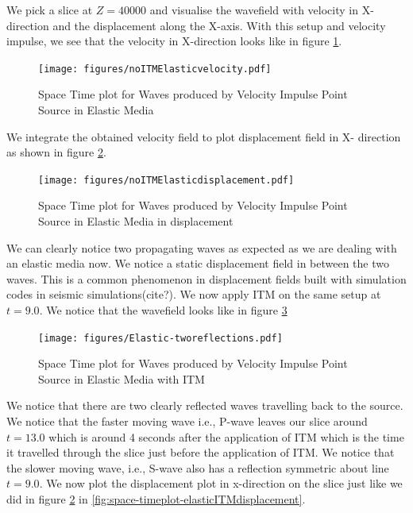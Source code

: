 We pick a slice at $Z = 40000$ and visualise the wavefield with velocity in X-direction and the displacement along the X-axis. With this setup and velocity impulse, 
we see that the velocity in X-direction looks like in figure \ref{fig:space-timeplot-elasticnoITM}.

\begin{figure}
    \centering
    \texttt{[image: figures/noITMElasticvelocity.pdf]}
    \caption{Space Time plot for Waves produced by Velocity Impulse Point Source in Elastic Media}
    \label{fig:space-timeplot-elasticnoITM}
\end{figure}

We integrate the obtained velocity field to plot displacement field in X- direction as shown in figure \ref{fig:space-timeplot-elasticnoITMdisplacement}.

\begin{figure}
    \centering
    \texttt{[image: figures/noITMElasticdisplacement.pdf]}
    \caption{Space Time plot for Waves produced by Velocity Impulse Point Source in Elastic Media in displacement}
    \label{fig:space-timeplot-elasticnoITMdisplacement}
\end{figure}

We can clearly notice two propagating waves as expected as we are dealing with an elastic media now. We notice a static displacement field in between the two waves.
This is a common phenomenon in displacement fields built with simulation codes in seismic simulations(cite?). 
We now apply \ac{ITM} on the same setup at $t=9.0$. We notice that the wavefield looks like in figure \ref{fig:space-timeplot-elasticITM}

\begin{figure}
    \centering
    \texttt{[image: figures/Elastic-tworeflections.pdf]}
    \caption{Space Time plot for Waves produced by Velocity Impulse Point Source in Elastic Media with \ac{ITM}}
    \label{fig:space-timeplot-elasticITM}
\end{figure}

We notice that there are two clearly reflected waves travelling back to the source. We notice that the faster moving wave i.e., P-wave leaves our slice around 
$t=13.0$ which is around 4 seconds after the application of \ac{ITM} which is the time it travelled through the slice just before the application of \ac{ITM}. 
We notice that the slower moving wave, i.e., S-wave also has a reflection symmetric about line $t=9.0$. We now plot the displacement plot in x-direction on the 
slice just like we did in figure \ref{fig:space-timeplot-elasticnoITMdisplacement} in \ref{fig:space-timeplot-elasticITMdisplacement}.

